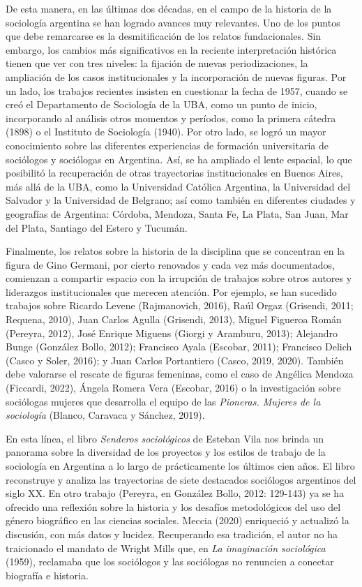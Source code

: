 De esta manera, en las últimas dos décadas, en el campo de la historia de la sociología argentina se han logrado avances muy relevantes. Uno de los puntos que debe remarcarse es la desmitificación de los relatos fundacionales. Sin embargo, los cambios más significativos en la reciente interpretación histórica tienen que ver con tres niveles: la fijación de nuevas periodizaciones, la ampliación de los casos institucionales y la incorporación de nuevas figuras. Por un lado, los trabajos recientes insisten en cuestionar la fecha de 1957, cuando se creó el Departamento de Sociología de la UBA, como un punto de inicio, incorporando al análisis otros momentos y períodos, como la primera cátedra (1898) o el Instituto de Sociología (1940). Por otro lado, se logró un mayor conocimiento sobre las diferentes experiencias de formación universitaria de sociólogos y sociólogas en Argentina. Así, se ha ampliado el lente espacial, lo que posibilitó la recuperación de otras trayectorias institucionales en Buenos Aires, más allá de la UBA, como la Universidad Católica Argentina, la Universidad del Salvador y la Universidad de Belgrano; así como también en diferentes ciudades y geografías de Argentina: Córdoba, Mendoza, Santa Fe, La Plata, San Juan, Mar del Plata, Santiago del Estero y Tucumán.

Finalmente, los relatos sobre la historia de la disciplina que se concentran en la figura de Gino Germani, por cierto renovados y cada vez más documentados, comienzan a compartir espacio con la irrupción de trabajos sobre otros autores y liderazgos institucionales que merecen atención. Por ejemplo, se han sucedido trabajos sobre Ricardo Levene (Rajmanovich, 2016), Raúl Orgaz (Grisendi, 2011; Requena, 2010), Juan Carlos Agulla (Grisendi, 2013), Miguel Figueroa Román (Pereyra, 2012), José Enrique Miguens (Giorgi y Aramburu, 2013); Alejandro Bunge (González Bollo, 2012); Francisco Ayala (Escobar, 2011); Francisco Delich (Casco y Soler, 2016); y Juan Carlos Portantiero (Casco, 2019, 2020). También debe valorarse el rescate de figuras femeninas, como el caso de Angélica Mendoza (Ficcardi, 2022), Ángela Romera Vera (Escobar, 2016) o la investigación sobre sociólogas mujeres que desarrolla el equipo de las \emph{Pioneras. Mujeres de la sociología} (Blanco, Caravaca y Sánchez, 2019).

En esta línea, el libro \emph{Senderos sociológicos} de Esteban Vila nos brinda un panorama sobre la diversidad de los proyectos y los estilos de trabajo de la sociología en Argentina a lo largo de prácticamente los últimos cien años. El libro reconstruye y analiza las trayectorias de siete destacados sociólogos argentinos del siglo XX. En otro trabajo (Pereyra, en González Bollo, 2012: 129-143) ya se ha ofrecido una reflexión sobre la historia y los desafíos metodológicos del uso del género biográfico en las ciencias sociales. Meccia (2020) enriqueció y actualizó la discusión, con más datos y lucidez. Recuperando esa tradición, el autor no ha traicionado el mandato de Wright Mills que, en \emph{La imaginación sociológica} (1959), reclamaba que los sociólogos y las sociólogas no renuncien a conectar biografía e historia.

